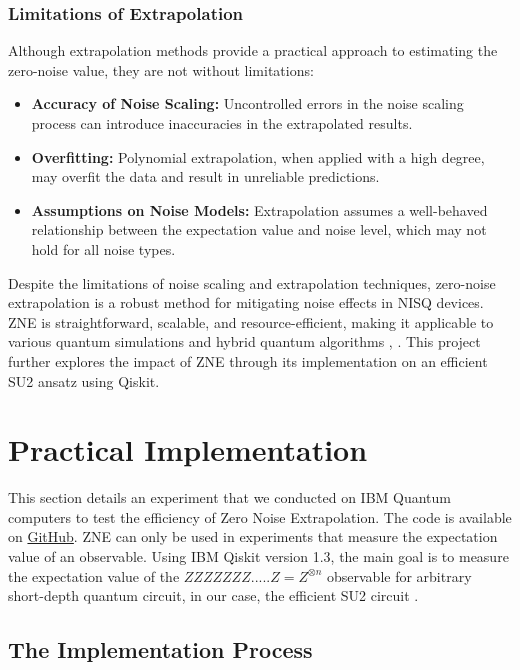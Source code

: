 \documentclass[12pt]{article}
\begin{document}
\subsubsection{Limitations of Extrapolation}

Although extrapolation methods provide a practical approach to estimating the zero-noise value, they are not without limitations:
\begin{itemize}
    \item \textbf{Accuracy of Noise Scaling:} Uncontrolled errors in the noise scaling process can introduce inaccuracies in the extrapolated results.
    \item \textbf{Overfitting:} Polynomial extrapolation, when applied with a high degree, may overfit the data and result in unreliable predictions.
    \item \textbf{Assumptions on Noise Models:} Extrapolation assumes a well-behaved relationship between the expectation value and noise level, which may not hold for all noise types.
\end{itemize}

Despite the limitations of noise scaling and extrapolation techniques, zero-noise extrapolation is a robust method for mitigating noise effects in NISQ devices. ZNE is straightforward, scalable, and resource-efficient, making it applicable to various quantum simulations and hybrid quantum algorithms \cite{app-bhattacharjee2024}, \cite{app-halder2023development}. This project further explores the impact of ZNE through its implementation on an efficient SU2 ansatz using Qiskit.


\section{Practical Implementation}
This section details an experiment that we conducted on IBM Quantum computers to test the efficiency of Zero Noise Extrapolation. The code is available on \href{https://github.com/RishwiBT/Quantum-Error-Suppression-mitigation-and-correction/blob/main/ZNE%20Code/Final_QEC_Project_code.ipynb}{GitHub}. ZNE can only be used in experiments that measure the expectation value of an observable. Using IBM Qiskit version 1.3, the main goal is to measure the expectation value of the $ZZZZZZZ.....Z = Z^{\otimes n}$ observable for arbitrary short-depth quantum circuit, in our case, the efficient SU2 circuit \cite{ibm_efficientSU2}.

\subsection{The Implementation Process}
\end{document}
